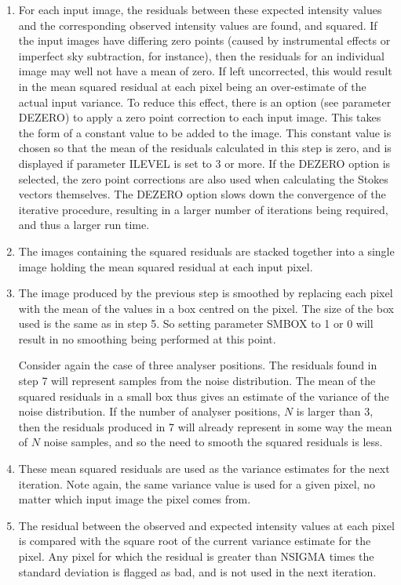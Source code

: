 \documentclass[twoside,11pt]{starlink}
\begin{document}
\begin{enumerate}
\item For each input image, the residuals between these expected intensity
values and the corresponding observed intensity values are found, and
squared. If the input images have differing zero points (caused by
instrumental effects or imperfect sky subtraction, for instance), then
the residuals for an individual image may well not have a mean of zero.
If left uncorrected, this would result in the mean squared residual at
each pixel being an over-estimate of the actual input variance. To reduce
this effect, there is an option (see parameter DEZERO) to apply a zero
point correction to each input image. This takes the form of a constant
value to be added to the image. This constant value is chosen so that the
mean of the residuals calculated in this step is zero, and is displayed
if parameter ILEVEL is set to 3 or more. If the DEZERO option is
selected, the zero point corrections are also used when calculating the
Stokes vectors themselves. The DEZERO option slows down the convergence
of the iterative procedure, resulting in a larger number of iterations
being required, and thus a larger run time.

\item The images containing the squared residuals are stacked together
into a single image holding the mean squared residual at each input pixel.

\item The image produced by the previous step is smoothed by replacing
each pixel with the mean of the values in a box centred on the pixel.
The size of the box used is the same as in step 5. So setting
parameter SMBOX to 1 or 0 will result in no smoothing being performed
at this point.

Consider again the case of three analyser positions. The residuals found in
step 7 will represent samples from the noise distribution. The
mean of the squared residuals in a small box thus gives an estimate of the
variance of the noise distribution. If the number of analyser positions,
$N$ is larger than 3, then the residuals produced in 7 will already
represent in some way the mean of $N$ noise samples, and so the need to
smooth the squared residuals is less.

\item These mean squared residuals are used as the variance estimates
for the next iteration. Note again, the same variance value is used for
a given pixel, no matter which input image the pixel comes from.

\item The residual between the observed and expected intensity values at
each pixel is compared with the square root of the current variance estimate
for the pixel. Any pixel for which the residual is greater than NSIGMA
times the standard deviation is flagged as bad, and is not used in the
next iteration.


\end{enumerate}
\end{document}
